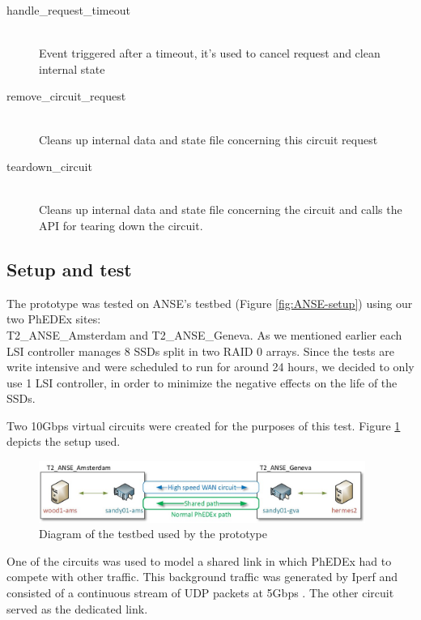 \begin{description}
	\item[handle\_request\_timeout] \hfill \\
		Event triggered after a timeout, it's used to cancel request and clean internal state
	\item[remove\_circuit\_request] \hfill \\
		Cleans up internal data and state file concerning this circuit request
	\item[teardown\_circuit] \hfill \\
		Cleans up internal data and state file concerning the circuit and calls the API for 
		tearing down the circuit.
\end{description}

\subsection{Setup and test}

The prototype was tested on ANSE's testbed (Figure \ref{fig:ANSE-setup}) using 
our two PhEDEx sites: \\ T2\_ANSE\_Amsterdam and T2\_ANSE\_Geneva. As we mentioned earlier
each LSI controller manages 8 SSDs split in two RAID 0 arrays. Since the tests are write 
 intensive and were scheduled to run for around 24 hours, we decided to only use 
 1 LSI controller, in order to minimize the negative effects on the life of the SSDs.


Two 10Gbps virtual circuits were created for the purposes of this test. Figure \ref{fig:testbed}
depicts the setup used.

\begin{figure}[h]
  \centering
  \includegraphics[width=0.95\textwidth]{Figures/FileDownload_ANSE_Testbed}
  \caption{Diagram of the testbed used by the prototype}
  \label{fig:testbed}
\end{figure} 

One of the circuits was used to model a shared link in which PhEDEx had to compete 
with other traffic. This background traffic was generated by Iperf and consisted of a 
continuous stream of UDP packets at 5Gbps . The other circuit served as the dedicated
link.

